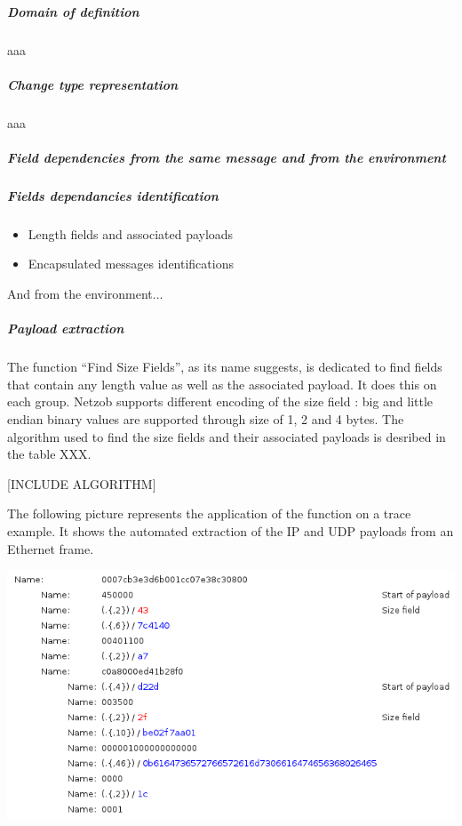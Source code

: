 \documentclass[letterpaper,10pt,english]{sphinxmanual}
\begin{document}
\subparagraph{Domain of definition}
\label{modelization/vocabular:domain-of-definition}
aaa


\subparagraph{Change type representation}
\label{modelization/vocabular:change-type-representation}
aaa


\subparagraph{Field dependencies from the same message and from the environment}
\label{modelization/vocabular:field-dependencies-from-the-same-message-and-from-the-environment}

\subparagraph{Fields dependancies identification}
\label{modelization/vocabular:fields-dependancies-identification}\begin{itemize}
\item {} 
Length fields and associated payloads

\item {} 
Encapsulated messages identifications

\end{itemize}

And from the environment...


\subparagraph{Payload extraction}
\label{modelization/vocabular:payload-extraction}
The function ``Find Size Fields'', as its name suggests, is dedicated to find fields that contain any length value as well as the associated payload. It does this on each group. Netzob supports different encoding of the size field : big and little endian binary values are supported through size of 1, 2 and 4 bytes. The algorithm used to find the size fields and their associated payloads is desribed in the table XXX.

{[}INCLUDE ALGORITHM{]}

The following picture represents the application of the function on a trace example. It shows the automated extraction of the IP and UDP payloads from an Ethernet frame.

\includegraphics{payload_extraction.png}
\end{document}
